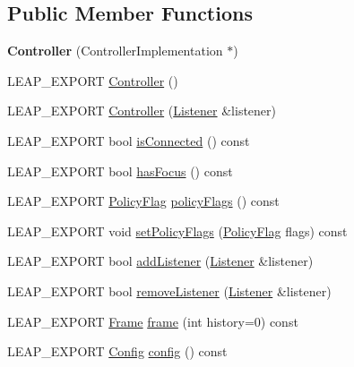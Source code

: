 \subsection*{Public Member Functions}
\begin{DoxyCompactItemize}
\item 
\hypertarget{class_leap_1_1_controller_a356eee86e8cd232b3f6829986a64add5}{{\bfseries Controller} (Controller\+Implementation $\ast$)}\label{class_leap_1_1_controller_a356eee86e8cd232b3f6829986a64add5}

\item 
L\+E\+A\+P\+\_\+\+E\+X\+P\+O\+R\+T \hyperlink{class_leap_1_1_controller_af5867527cc80ad805597a285eaf3d406}{Controller} ()
\item 
L\+E\+A\+P\+\_\+\+E\+X\+P\+O\+R\+T \hyperlink{class_leap_1_1_controller_a046b09a621c480a46b3783551191abbb}{Controller} (\hyperlink{class_leap_1_1_listener}{Listener} \&listener)
\item 
L\+E\+A\+P\+\_\+\+E\+X\+P\+O\+R\+T bool \hyperlink{class_leap_1_1_controller_a1d7190d58adb6907d0e7c14d1ed595b4}{is\+Connected} () const 
\item 
L\+E\+A\+P\+\_\+\+E\+X\+P\+O\+R\+T bool \hyperlink{class_leap_1_1_controller_ab57ca1cb5b3278ff7016fa53028a1441}{has\+Focus} () const 
\item 
L\+E\+A\+P\+\_\+\+E\+X\+P\+O\+R\+T \hyperlink{class_leap_1_1_controller_a0bdb49fa94aa2da8b098c1ac296528d6}{Policy\+Flag} \hyperlink{class_leap_1_1_controller_af777725d8ab0793a03b5a9cee6e33480}{policy\+Flags} () const 
\item 
L\+E\+A\+P\+\_\+\+E\+X\+P\+O\+R\+T void \hyperlink{class_leap_1_1_controller_a9830f0a63b393ce83f3147101452d028}{set\+Policy\+Flags} (\hyperlink{class_leap_1_1_controller_a0bdb49fa94aa2da8b098c1ac296528d6}{Policy\+Flag} flags) const 
\item 
L\+E\+A\+P\+\_\+\+E\+X\+P\+O\+R\+T bool \hyperlink{class_leap_1_1_controller_a9b6318221593be63a0385748ca66974f}{add\+Listener} (\hyperlink{class_leap_1_1_listener}{Listener} \&listener)
\item 
L\+E\+A\+P\+\_\+\+E\+X\+P\+O\+R\+T bool \hyperlink{class_leap_1_1_controller_a1a48d46f317f0368cc8f7b0ebfd77728}{remove\+Listener} (\hyperlink{class_leap_1_1_listener}{Listener} \&listener)
\item 
L\+E\+A\+P\+\_\+\+E\+X\+P\+O\+R\+T \hyperlink{class_leap_1_1_frame}{Frame} \hyperlink{class_leap_1_1_controller_a5796b988806ea9fd94e2d987e0e24b32}{frame} (int history=0) const 
\item 
L\+E\+A\+P\+\_\+\+E\+X\+P\+O\+R\+T \hyperlink{class_leap_1_1_config}{Config} \hyperlink{class_leap_1_1_controller_abbb48ad47a8d0859a6a98f48c3d0a322}{config} () const 

\end{DoxyCompactItemize}
